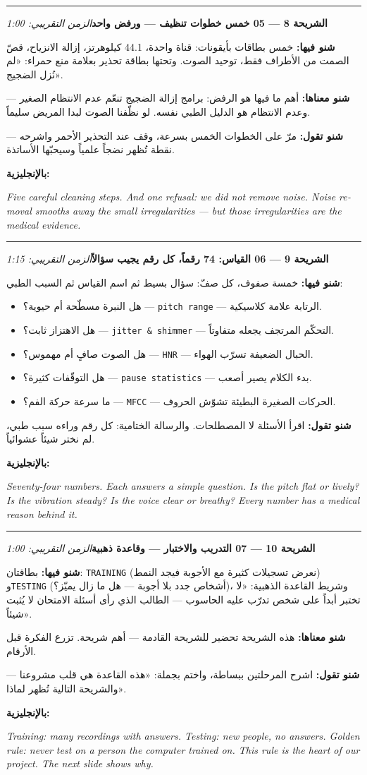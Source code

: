\documentclass[12pt,a4paper]{article}
\newcommand{\E}[1]{\textenglish{\texttt{#1}}}
\newcommand{\N}[1]{\textenglish{#1}}
\newcommand{\slayd}[3]{%
  \par\vspace{10pt}\hrule\vspace{8pt}%
  {\large\textbf{الشريحة #1 — #2}}\hfill{\small\textit{الزمن التقريبي: #3}}\par\vspace{4pt}%
}
\newcommand{\fiha}{\textbf{شنو فيها: }}
\newcommand{\managementhaha}{\textbf{شنو معناها: }}
\newcommand{\tqul}{\textbf{شنو تقول: }}
\newcommand{\bilinglizi}[1]{\par\textbf{بالإنجليزية:}\par
  \begin{english}\small\itshape #1\end{english}\par}
\begin{document}
\slayd{\N{8}}{\N{05} خمس خطوات تنظيف — ورفض واحد}{\N{1:00}}
\fiha خمس بطاقات بأيقونات: قناة واحدة، \N{44.1} كيلوهرتز، إزالة
الانزياح، قصّ الصمت من الأطراف فقط، توحيد الصوت. وتحتها بطاقة تحذير
بعلامة منع حمراء: «لم نُزل الضجيج».
\par\managementhaha أهم ما فيها هو الرفض: برامج إزالة الضجيج تنعّم عدم
الانتظام الصغير — وعدم الانتظام هو الدليل الطبي نفسه. لو نظّفنا الصوت
لبدا المريض سليماً.
\par\tqul مرّ على الخطوات الخمس بسرعة، وقف عند التحذير الأحمر واشرحه —
نقطة تُظهر نضجاً علمياً وسيحبّها الأساتذة.
\bilinglizi{Five careful cleaning steps. And one refusal: we did not
remove noise. Noise removal smooths away the small irregularities ---
but those irregularities are the medical evidence.}

\slayd{\N{9}}{\N{06} القياس: \N{74} رقماً، كل رقم يجيب سؤالاً}{\N{1:15}}
\fiha خمسة صفوف، كل صفّ: سؤال بسيط ثم اسم القياس ثم السبب الطبي:
\begin{itemize}
  \item هل النبرة مسطّحة أم حيوية؟ — \E{pitch range} — الرتابة علامة
        كلاسيكية.
  \item هل الاهتزاز ثابت؟ — \E{jitter \& shimmer} — التحكّم المرتجف
        يجعله متفاوتاً.
  \item هل الصوت صافٍ أم مهموس؟ — \E{HNR} — الحبال الضعيفة تسرّب الهواء.
  \item هل التوقّفات كثيرة؟ — \E{pause statistics} — بدء الكلام يصير
        أصعب.
  \item ما سرعة حركة الفم؟ — \E{MFCC} — الحركات الصغيرة البطيئة تشوّش
        الحروف.
\end{itemize}
\tqul اقرأ الأسئلة لا المصطلحات. والرسالة الختامية: كل رقم وراءه سبب
طبي، لم نختر شيئاً عشوائياً.
\bilinglizi{Seventy-four numbers. Each answers a simple question. Is the
pitch flat or lively? Is the vibration steady? Is the voice clear or
breathy? Every number has a medical reason behind it.}

\slayd{\N{10}}{\N{07} التدريب والاختبار — وقاعدة ذهبية}{\N{1:00}}
\fiha بطاقتان: \E{TRAINING} (نعرض تسجيلات كثيرة مع الأجوبة فيجد النمط)
و\E{TESTING} (أشخاص جدد بلا أجوبة — هل ما زال يميّز؟)، وشريط القاعدة
الذهبية: «لا تختبر أبداً على شخص تدرّب عليه الحاسوب — الطالب الذي رأى
أسئلة الامتحان لا يُثبت شيئاً».
\par\managementhaha هذه الشريحة تحضير للشريحة القادمة — أهم شريحة. تزرع
الفكرة قبل الأرقام.
\par\tqul اشرح المرحلتين ببساطة، واختم بجملة: «هذه القاعدة هي قلب
مشروعنا — والشريحة التالية تُظهر لماذا».
\bilinglizi{Training: many recordings with answers. Testing: new people,
no answers. Golden rule: never test on a person the computer trained on.
This rule is the heart of our project. The next slide shows why.}
\end{document}
